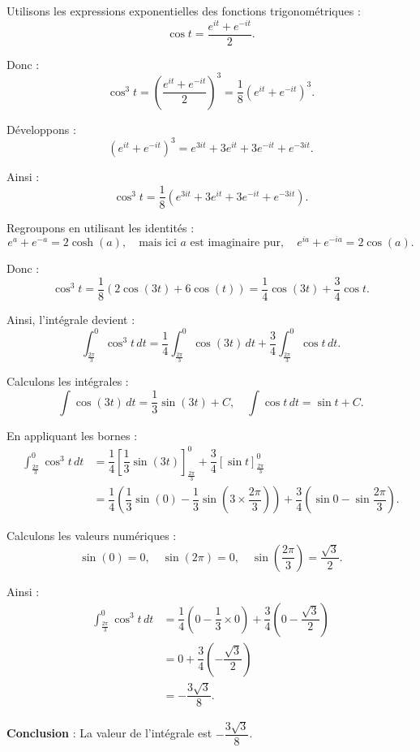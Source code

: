 \documentclass[a4paper,12pt]{article}
\begin{document}
\begin{solutionbox}
Utilisons les expressions exponentielles des fonctions trigonométriques :
\[
\cos t = \dfrac{e^{it} + e^{-it}}{2}.
\]

Donc :
\[
\cos^3 t = \left( \dfrac{e^{it} + e^{-it}}{2} \right)^3 = \dfrac{1}{8} \left( e^{it} + e^{-it} \right)^3.
\]

Développons :
\[
\left( e^{it} + e^{-it} \right)^3 = e^{3it} + 3e^{it} + 3e^{-it} + e^{-3it}.
\]

Ainsi :
\[
\cos^3 t = \dfrac{1}{8} \left( e^{3it} + 3e^{it} + 3e^{-it} + e^{-3it} \right).
\]

Regroupons en utilisant les identités :
\[
e^{a} + e^{-a} = 2\cosh(a), \quad \text{mais ici } a \text{ est imaginaire pur}, \quad e^{ia} + e^{-ia} = 2\cos(a).
\]

Donc :
\[
\cos^3 t = \dfrac{1}{8} \left( 2\cos(3t) + 6\cos(t) \right) = \dfrac{1}{4} \cos(3t) + \dfrac{3}{4} \cos t.
\]

Ainsi, l'intégrale devient :
\[
\int_{\frac{2\pi}{3}}^{0} \cos^3 t \, dt = \dfrac{1}{4} \int_{\frac{2\pi}{3}}^{0} \cos(3t) \, dt + \dfrac{3}{4} \int_{\frac{2\pi}{3}}^{0} \cos t \, dt.
\]

Calculons les intégrales :
\[
\int \cos(3t) \, dt = \dfrac{1}{3} \sin(3t) + C, \quad \int \cos t \, dt = \sin t + C.
\]

En appliquant les bornes :
\begin{align*}
\int_{\frac{2\pi}{3}}^{0} \cos^3 t \, dt &= \dfrac{1}{4} \left[ \dfrac{1}{3} \sin(3t) \right]_{\frac{2\pi}{3}}^{0} + \dfrac{3}{4} \left[ \sin t \right]_{\frac{2\pi}{3}}^{0} \\
&= \dfrac{1}{4} \left( \dfrac{1}{3} \sin(0) - \dfrac{1}{3} \sin\left( 3 \times \dfrac{2\pi}{3} \right) \right) + \dfrac{3}{4} \left( \sin 0 - \sin \dfrac{2\pi}{3} \right).
\end{align*}

Calculons les valeurs numériques :
\[
\sin(0) = 0, \quad \sin\left( 2\pi \right) = 0, \quad \sin\left( \dfrac{2\pi}{3} \right) = \dfrac{\sqrt{3}}{2}.
\]

Ainsi :
\begin{align*}
\int_{\frac{2\pi}{3}}^{0} \cos^3 t \, dt &= \dfrac{1}{4} \left( 0 - \dfrac{1}{3} \times 0 \right) + \dfrac{3}{4} \left( 0 - \dfrac{\sqrt{3}}{2} \right) \\
&= 0 + \dfrac{3}{4} \left( -\dfrac{\sqrt{3}}{2} \right) \\
&= -\dfrac{3\sqrt{3}}{8}.
\end{align*}

\textbf{Conclusion} : La valeur de l'intégrale est \( -\dfrac{3\sqrt{3}}{8} \).
\end{solutionbox}
\end{document}
